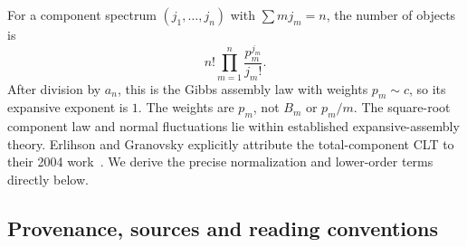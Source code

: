 \documentclass[11pt,letterpaper]{article}
\numberwithin{equation}{section}
\theoremstyle{remark}\newtheorem{remark}[theorem]{Remark}
\theoremstyle{definition}\newtheorem{definition}[theorem]{Definition}\theoremstyle{plain}
\begin{document}
For a component spectrum $(j_1,\ldots,j_n)$ with $\sum m j_m=n$, the
number of objects is
\[
 n!\prod_{m=1}^n\frac{p_m^{j_m}}{j_m!}.
\]
After division by $a_n$, this is the Gibbs assembly law with weights
$p_m\sim c$, so its expansive exponent is $1$. The weights are $p_m$,
not $B_m$ or $p_m/m$. The square-root component law and normal
fluctuations lie within established expansive-assembly theory.
Erlihson and Granovsky \cite[Corollary 4.5]{eg2008} explicitly attribute
the total-component CLT to their 2004 work~\cite{eg2004}. We derive the
precise normalization and lower-order terms directly below.

\subsection{Provenance, sources and reading conventions}\label{ncy:sec:provenance}
\end{document}
